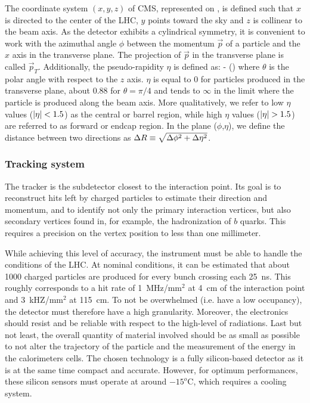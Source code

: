     The coordinate system $(x,y,z)$ of CMS, represented on ,
    is defined such that $x$ is directed to the center of the LHC, $y$ points toward
    the sky and $z$ is collinear to the beam axis. As the detector exhibits a
    cylindrical symmetry, it is convenient to work with the azimuthal angle $\phi$
    between the momentum $\vec{p}$ of a particle and the $x$ axis in the transverse
    plane. The projection of $\vec{p}$ in the transverse plane is called $\vec{p}_T$.
    Additionally, the pseudo-rapidity $\eta$ is defined as:
    {
        \eta {} - ()
    }
    where $\theta$ is the polar angle with respect to the $z$ axis. $\eta$ is equal
    to 0 for particles produced in
    the transverse plane, about 0.88 for $\theta = \pi/4$ and tends to $\infty$ in the
    limit where the particle is produced along the beam axis. More qualitatively, we
    refer to low $\eta$ values ($\left| \eta \right| < 1.5$) as the central or barrel region, while
    high $\eta$ values ($\left| \eta \right| > 1.5$) are referred to as forward or endcap region.
    In the plane ($\phi$,$\eta$), we define the distance between two directions as
    $\Delta R \equiv \sqrt{\Delta\phi^2 + \Delta \eta^2}$.


        \subsubsection{Tracking system}

    The tracker is the subdetector closest to the interaction point. Its goal
    is to reconstruct hits left by charged particles to estimate their direction
    and momentum, and to identify not only the primary interaction vertices, but also
    secondary vertices found in, for example, the hadronization of $b$ quarks. This requires
    a precision on the vertex position to less than one millimeter.

    While achieving this level of accuracy, the instrument must be able to handle the conditions of
    the LHC. At nominal conditions, it can be estimated that about 1000 charged particles
    are produced for every bunch crossing each 25~ns. This roughly corresponds to a
    hit rate of 1~MHz/mm$^2$ at 4~cm of the interaction point and 3~kHZ/mm$^2$ at 115~cm.
    To not be overwhelmed (i.e. have a low occupancy), the detector must therefore
    have a high granularity. Moreover, the electronics should resist and be reliable
    with respect to the high-level of radiations. Last but not least, the overall
    quantity of material involved should be as small as possible to not alter the
    trajectory of the particle and the measurement of the energy in the calorimeters
    cells. The chosen technology is a fully silicon-based detector as it is at the
    same time compact and accurate. However, for optimum performances, these silicon
    sensors must operate at around $-15^o$C, which requires a cooling system.


